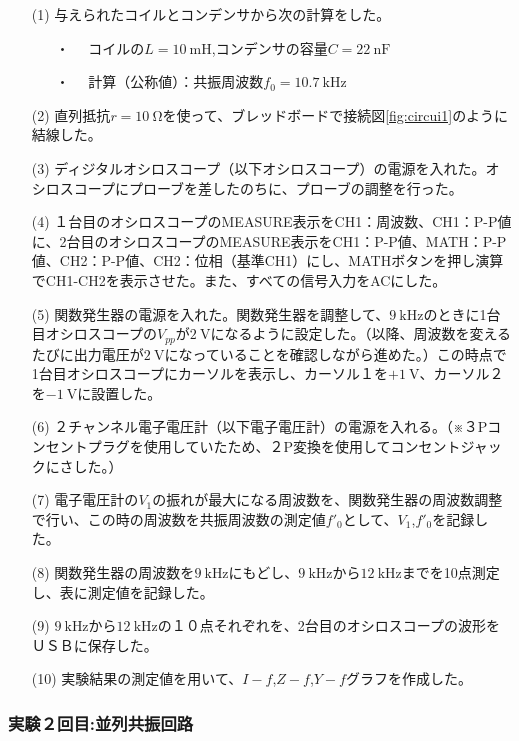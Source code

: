 \documentclass[12pt,a4paper]{jsarticle}
\numberwithin{equation}{section}
\numberwithin{figure}{section}
\numberwithin{table}{section}
\begin{document}
  \begin{itemize}
    \item [(1)] 与えられたコイルとコンデンサから次の計算をした。
    \begin{itemize}
      \item [・]　コイルの$L=\SI{10}{\milli\henry}$,コンデンサの容量$C=\SI{22}{\nano\farad}$
      \item [・]　計算（公称値）：共振周波数$f_0=\SI{10.7}{\kilo\hertz}$
    \end{itemize}
    \item [(2)] 直列抵抗$r=\SI{10}{\ohm}$を使って、ブレッドボードで接続図\ref{fig:circui1}のように結線した。
    \item [(3)] ディジタルオシロスコープ（以下オシロスコープ）の電源を入れた。オシロスコープにプローブを差したのちに、プローブの調整を行った。
    \item [(4)] １台目のオシロスコープのMEASURE表示をCH1：周波数、CH1：P-P値に、2台目のオシロスコープのMEASURE表示をCH1：P-P値、MATH：P-P値、CH2：P-P値、CH2：位相（基準CH1）にし、MATHボタンを押し演算でCH1-CH2を表示させた。また、すべての信号入力をACにした。
    \item [(5)] 関数発生器の電源を入れた。関数発生器を調整して、$\SI{9}{\kilo\hertz}$のときに1台目オシロスコープの$V_{pp}$が$\SI{2}{\volt}$になるように設定した。（以降、周波数を変えるたびに出力電圧が$\SI{2}{\volt}$になっていることを確認しながら進めた。）この時点で1台目オシロスコープにカーソルを表示し、カーソル１を$+\SI{1}{\volt}$、カーソル２を$-\SI{1}{\volt}$に設置した。
    \item [(6)] ２チャンネル電子電圧計（以下電子電圧計）の電源を入れる。（※３Pコンセントプラグを使用していたため、２P変換を使用してコンセントジャックにさした。）
    \item [(7)] 電子電圧計の$\si{V_1}$の振れが最大になる周波数を、関数発生器の周波数調整で行い、この時の周波数を共振周波数の測定値$f'_0$として、$V_1$,$f'_0$を記録した。
    \item [(8)] 関数発生器の周波数を$\SI{9}{\kilo\hertz}$にもどし、$\SI{9}{\kilo\hertz}$から$\SI{12}{\kilo\hertz}$までを10点測定し、表に測定値を記録した。
    \item [(9)]$\SI{9}{\kilo\hertz}$から$\SI{12}{\kilo\hertz}$の１０点それぞれを、2台目のオシロスコープの波形をＵＳＢに保存した。
    \item [(10)]実験結果の測定値を用いて、$I-f$,$Z-f$,$Y-f$グラフを作成した。
  \end{itemize}

  \subsubsection{実験２回目:並列共振回路}
\end{document}

